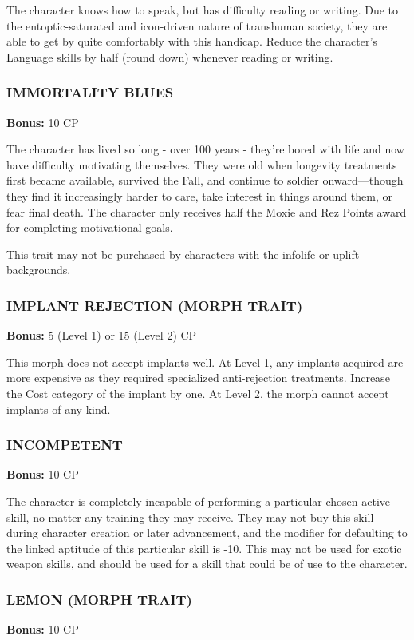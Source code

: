 The character knows how to speak, but has difficulty reading or writing. Due
to the entoptic-saturated and icon-driven nature of transhuman society, they
are able to get by quite comfortably with this handicap.  Reduce the
character’s Language skills by half (round down) whenever reading or writing.

\subsubsection{IMMORTALITY BLUES}
\textbf{Bonus:} 10 CP

The character has lived so long - over 100 years - they’re bored with life and
now have difficulty motivating themselves. They were old when longevity
treatments first became available, survived the Fall, and continue to soldier
onward—though they find it increasingly harder to care, take interest in things
around them, or fear final death. The character only receives half the Moxie
and Rez Points award for completing motivational goals.

This trait may not be purchased by characters with the infolife or uplift
backgrounds.

\subsubsection{IMPLANT REJECTION (MORPH TRAIT)}
\textbf{Bonus:} 5 (Level 1) or 15 (Level 2) CP

This morph does not accept implants well. At Level 1, any implants acquired are
more expensive as they required specialized anti-rejection treatments. Increase
the Cost category of the implant by one. At Level 2, the morph cannot accept
implants of any kind.

\subsubsection{INCOMPETENT}
\textbf{Bonus:} 10 CP

The character is completely incapable of performing a particular chosen active
skill, no matter any training they may receive. They may not buy this skill
during character creation or later advancement, and the modifier for defaulting
to the linked aptitude of this particular skill is -10. This may not be used
for exotic weapon skills, and should be used for a skill that could be of use
to the character.

\subsubsection{LEMON (MORPH TRAIT)}
\textbf{Bonus:} 10 CP

